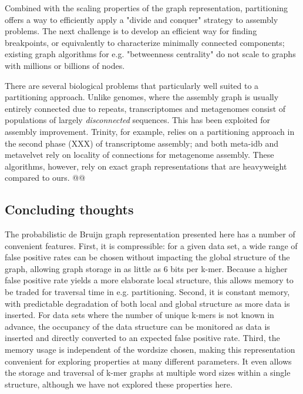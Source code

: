 \documentclass[12pt]{article} \usepackage{simplemargins}
\begin{document}
Combined with the scaling properties of the graph representation,
partitioning offers a way to efficiently apply a "divide and conquer"
strategy to assembly problems.  The next challenge is to develop an
efficient way for finding breakpoints, or equivalently to characterize
minimally connected components; existing graph algorithms for
e.g. "betweenness centrality" do not scale to graphs with millions or
billions of nodes.

There are several biological problems that particularly well suited to
a partitioning approach.  Unlike genomes, where the assembly graph is
usually entirely connected due to repeats, transcriptomes and
metagenomes consist of populations of largely {\em disconnected}
sequences.  This has been exploited for assembly improvement.
Trinity, for example, relies on a partitioning approach in the second
phase (XXX) of transcriptome assembly; and both meta-idb and
metavelvet rely on locality of connections for metagenome assembly.
These algorithms, however, rely on exact graph representations that are
heavyweight compared to ours. @@

\subsection{Concluding thoughts}

The probabilistic de Bruijn graph representation presented here has a
number of convenient features.  First, it is compressible: for a given
data set, a wide range of false positive rates can be chosen without
impacting the global structure of the graph, allowing graph storage in
as little as 6 bits per k-mer.  Because a higher false positive rate
yields a more elaborate local structure, this allows memory to be
traded for traversal time in e.g. partitioning.  Second, it is
constant memory, with predictable degradation of both local and global
structure as more data is inserted.  For data sets where the number of
unique k-mers is not known in advance, the occupancy of the data
structure can be monitored as data is inserted and directly converted
to an expected false positive rate.  Third, the memory usage is
independent of the wordsize chosen, making this representation
convenient for exploring properties at many different parameters.  It
even allows the storage and traversal of k-mer graphs at multiple word
sizes within a single structure, although we have not explored these
properties here.
\end{document}
